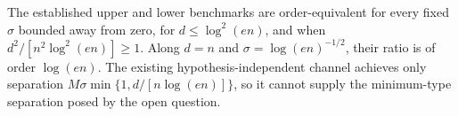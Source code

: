 The established upper and lower benchmarks are order-equivalent for every fixed \(\sigma\) bounded away from zero, for \(d\le\log^2(en)\), and when \(d^2/[n^2\log^2(en)]\ge1\).  Along \(d=n\) and \(\sigma=\log(en)^{-1/2}\), their ratio is of order \(\log(en)\).  The existing hypothesis-independent channel achieves only separation \(M\sigma\min\{1,d/[n\log(en)]\}\), so it cannot supply the minimum-type separation posed by the open question.